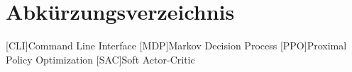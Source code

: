 \chapter*{Abkürzungsverzeichnis}

\begin{acronym}[PPOOO] %

	[CLI]{Command Line Interface}
	[MDP]{Markov Decision Process}
	[PPO]{Proximal Policy Optimization}
	[SAC]{Soft Actor-Critic}

\end{acronym}